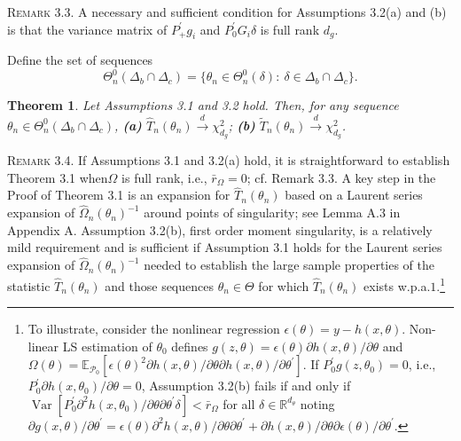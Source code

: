 \documentclass[hidelinks, 11 pt, a4paper, pdflatex]{article}
\DeclareMathOperator{\Var}{Var}
\newtheorem{theorem}{Theorem}[section]
\begin{document}
{   \textsc{Remark 3.3}. A necessary and sufficient condition for Assumptions 3.2(a) and (b) is that the variance matrix of 
    $P_{+}^{\prime}g_i$ and $P_{0}^{\prime}G_{i}\delta$ is full rank $d_g$.

   Define the set of sequences
    \[
     \Theta _{n}^{0}(\Delta_{b} \cap \Delta_{c}) = \{\theta_{n} \in \Theta_{n}^{0}(\delta):~\delta \in \Delta_{b} \cap \Delta_{c}\}.
    \]

    \begin{theorem}
     Let Assumptions 3.1 and 3.2 hold. Then, for any sequence $\theta _{n} \in \Theta_{n}^{0}(\Delta_{b} \cap \Delta_{c})$,
      \textbf{(a)} $\hat{T}_{n}(\theta_{n}) \overset{d}{\rightarrow} \chi_{d_{g}}^{2}$;
      \textbf{(b)} $\tilde{T}_{n}(\theta_{n}) \overset{d}{\rightarrow} \chi_{d_{g}}^{2}$.
    \end{theorem}

    \textsc{Remark 3.4}. If Assumptions 3.1 and 3.2(a) hold, it is straightforward to establish Theorem 3.1 when$\Omega$ is full
     rank, i.e., $\bar{r}_{\Omega} = 0$; cf. Remark 3.3. A key step in the Proof of Theorem 3.1 is an expansion for $\hat{T}_{n}(\theta_{n})$ based on a Laurent series expansion of $\hat{\Omega}_n(\theta_n)^{-1}$ around points of singularity; see Lemma A.3 in Appendix A. Assumption 3.2(b), first order moment singularity, is a relatively mild requirement and is sufficient if Assumption 3.1 holds for the Laurent series expansion of $\hat{\Omega}_{n}(\theta _{n})^{-1}$ needed to establish the large sample properties of the statistic $\hat{T}_{n}(\theta _{n})$ and those sequences $\theta _{n} \in \Theta$ for which $\hat{T}_{n}(\theta_{n})$ exists w.p.a.$1$.\footnote{To illustrate, consider the nonlinear regression
      $\epsilon(\theta) = y - h(x,\theta)$. Non-linear LS estimation of $\theta _{0}$ defines $g(z,\theta) = \epsilon(\theta) \partial h(x,\theta)/\partial \theta$ and $\Omega(\theta) = \mathbb{E}_{\mathcal{P}_{0}}[\epsilon(\theta)^{2} \partial h(x,\theta)/\partial \theta \partial h(x,\theta)/\partial \theta^{\prime}]$. If $P_{0}^{\prime}g(z,\theta_{0}) = 0$, i.e., $P_{0}^{\prime} \partial h(x,\theta_{0})/\partial \theta = 0$, Assumption 3.2(b) fails if and only if $\Var[P_{0}^{\prime} \partial^{2} h(x,\theta_0)/\partial \theta \partial \theta^{\prime } \delta] < \bar{r}_{\Omega }$ for all $\delta \in \mathbb{R}^{d_{\theta}}$ noting $\partial g(x,\theta)/\partial \theta^{\prime} = \epsilon(\theta) \partial^{2} h(x,\theta)/\partial \theta \partial \theta^{\prime} + \partial h(x,\theta)/\partial \theta \partial \epsilon(\theta)/\partial \theta^{\prime }$.}

}
\end{document}
